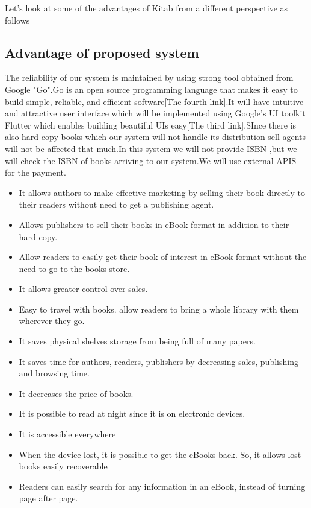 Let’s look at some of the advantages of Kitab from a different perspective as follows


\subsection{Advantage of proposed system}
		The reliability of our system is maintained by using strong tool obtained from Google "Go".Go is an open source programming language that makes it easy to build simple, reliable, and efficient software[The fourth link].It will have intuitive and attractive user interface which will be implemented using  Google’s UI toolkit Flutter which enables building beautiful UIs easy[The third link].SInce there is also hard copy books which our system will not handle its distribution sell agents will not be affected that much.In this system we will not provide ISBN ,but we will  check the ISBN of books arriving to our system.We will use external APIS for the payment.

\begin{itemize}
	\item It allows authors to make effective marketing by selling their book directly to their readers without need to get a publishing agent.
	\item Allows publishers to sell their books in eBook format in addition to their hard copy.
	\item Allow readers to easily get their book of interest in eBook format without the need to go to the books store.
	\item It allows greater control over sales.
	\item Easy to travel with books. allow readers to bring a whole library with them wherever they go.
	\item It saves physical shelves storage from being full of many papers.
	\item It saves time for authors, readers, publishers by decreasing sales, publishing and browsing time.
	\item It decreases the price of books.
	\item It is possible to read at night since it is on electronic devices.
	\item It is accessible everywhere 
	\item When the device lost, it is possible to get the eBooks back. So, it allows lost books easily recoverable
	\item Readers can easily search for any information in an eBook, instead of turning page after page.
\end{itemize}

